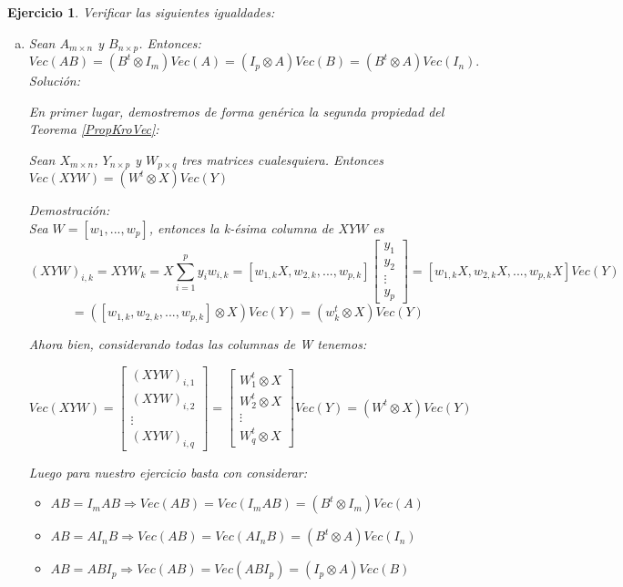 \documentclass{article}
\theoremstyle{theorem-style}  %
\theoremstyle{definition-style}
\theoremstyle{example-style}
\theoremstyle{exercise-style}
\newtheorem{exercise}{Ejercicio}[section]
\begin{document}
	\begin{exercise}
		Verificar las siguientes igualdades:
		\begin{enumerate}[a)]
			\item Sean $A_{m \times n}$ y $B_{n \times p}$. Entonces:
			$$Vec(AB) = (B^t \otimes I_m)Vec(A) = (I_p \otimes A)Vec(B) = (B^t \otimes A)Vec(I_n).$$		
			\textit{Solución:}
			
			En primer lugar, demostremos de forma genérica la segunda propiedad del Teorema \ref{PropKroVec}:
			
			\textit{Sean $X_{m \times n}$, $Y_{n \times p}$ y $W_{p \times q}$ tres matrices cualesquiera. Entonces $Vec(XYW) = (W^t \otimes X)Vec(Y)$}
			
			\textit{Demostración:}
			\\Sea $W=[w_1,...,w_p]$, entonces la k-ésima columna de $XYW$ es $$(XYW)_{i,k}=XYW_k=X\sum_{i=1}^{p}y_iw_{i,k}=[w_{1,k}X,w_{2,k},...,w_{p,k}] \left[{\begin{array}{c} y_1\\ y_2\\ \vdots \\ y_p \end{array} } \right] = [w_{1,k}X, w_{2,k}X,...,w_{p,k}X]Vec(Y)$$
			$$= ([w_{1,k}, w_{2,k},...,w_{p,k}]\otimes X)Vec(Y) = (w_k^t \otimes X)Vec(Y)$$
			
			Ahora bien, considerando todas las columnas de W tenemos:
			
			$$Vec(XYW)= \left[\begin{array}{c} (XYW)_{i,1}\\ (XYW)_{i,2}\\ \vdots \\ (XYW)_{i,q} \end{array}  \right]=
			\left[\begin{array}{c} W_1^t\otimes X\\ W_2^t\otimes X\\ \vdots \\ W_q^t\otimes X \end{array}  \right]Vec(Y) = (W^t \otimes X)Vec(Y)$$
			
			Luego para nuestro ejercicio basta con considerar:
			\begin{itemize}
				\item $AB = I_mAB \Rightarrow Vec(AB)=Vec(I_mAB)=(B^t\otimes I_m)Vec(A)$
				\item $AB = AI_nB \Rightarrow Vec(AB)=Vec(AI_nB)=(B^t\otimes A)Vec(I_n)$
				\item $AB = ABI_p \Rightarrow Vec(AB)=Vec(ABI_p)=(I_p\otimes A)Vec(B)$
			\end{itemize}
				

\end{enumerate}
\end{exercise}
\end{document}

